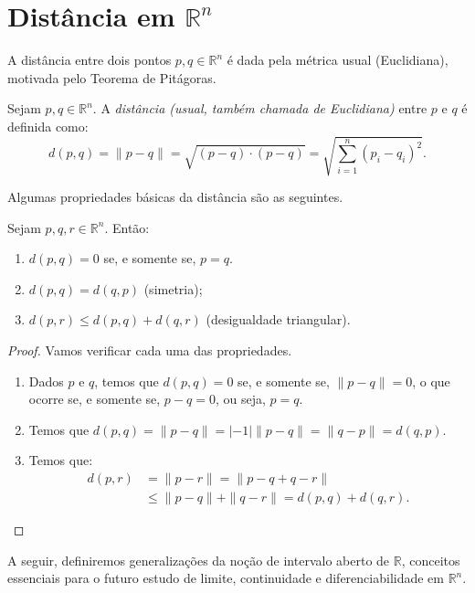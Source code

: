 \section{Distância em $\mathbb R^n$}
A distância entre dois pontos $p, q \in \mathbb R^n$ é dada pela métrica usual (Euclidiana), motivada pelo Teorema de Pitágoras.

\begin{definition}
    Sejam $p, q \in \mathbb R^n$. A \emph{distância (usual, também chamada de Euclidiana)} entre $p$ e $q$ é definida como:
    \begin{equation*}
        d(p, q) = \|p-q\| = \sqrt{(p-q) \cdot (p-q)}=\sqrt{\sum_{i=1}^n (p_i - q_i)^2}.
    \end{equation*}
\end{definition}

Algumas propriedades básicas da distância são as seguintes.
\begin{proposition}
    Sejam $p, q, r \in \mathbb R^n$. Então:
    \begin{enumerate}
        \item $d(p, q) = 0$ se, e somente se, $p=q$.
        \item $d(p, q) = d(q, p)$ (simetria);
        \item $d(p, r) \leq d(p, q) + d(q, r)$ (desigualdade triangular).
    \end{enumerate}
\end{proposition}
\begin{proof}
    Vamos verificar cada uma das propriedades.
    \begin{enumerate}
        \item Dados $p$ e $q$, temos que $d(p, q) = 0$ se, e somente se, $\|p-q\|=0$, o que ocorre se, e somente se, $p-q=0$, ou seja, $p=q$.
        \item Temos que $d(p, q) = \|p-q\| = |-1|\|p-q\| = \|q-p\| = d(q, p)$.
        \item Temos que:
        \begin{align*}
            d(p, r) &= \|p-r\| = \|p-q+q-r\| \\
            &\leq \|p-q\| + \|q-r\| = d(p, q) + d(q, r).
        \end{align*}
    \end{enumerate}
\end{proof}

A seguir, definiremos generalizações da noção de intervalo aberto de $\mathbb R$, conceitos essenciais para o futuro estudo de limite, continuidade e diferenciabilidade em $\mathbb R^n$.

